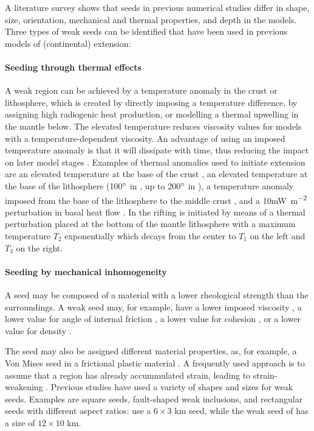 A literature survey shows that seeds in previous numerical studies differ in shape, size, 
orientation, mechanical and thermal properties, and depth in the models. 
Three types of weak seeds can be identified that have been 
used in previous models of (continental) extension:

\paragraph{Seeding through thermal effects}
A weak region can be achieved by a temperature anomaly in the crust or lithosphere,
which is created by directly imposing a temperature difference, by assigning high radiogenic 
heat production, or modelling a thermal upwelling in the mantle below.
The elevated temperature reduces viscosity values for models with a temperature-dependent 
viscosity.
An advantage of using an imposed temperature anomaly is that it will dissipate with time, 
thus reducing the impact on later model stages \cite{hani03}.
Examples of thermal anomalies used to initiate extension are
an elevated temperature at the base of the crust \cite{hani03},
an elevated temperature at the base of the lithosphere 
(100$\rm^\circ$ in \cite{bupo01}, 
up to 200$\rm^\circ$ in \cite{brau13}),
a temperature anomaly imposed from the base of the lithosphere to the middle
crust \cite{chld92},
and a 10\si{\milli\watt\per\square\metre} perturbation in basal heat flow \cite{frbr01}.
In \cite{bupo01} the rifting is initiated by means of 
a thermal perturbation placed at the bottom of the mantle lithosphere with a maximum temperature $T_{2}$ 
exponentially which decays from the center to $T_{1}$ on the left and $T_{3}$ on the right. 

\paragraph{Seeding by mechanical inhomogeneity} 
A seed may be composed of a material with a lower rheological strength than the 
surroundings.
A weak seed may, for example, have a lower imposed viscosity 
\cite{lemm08,kaus10,mishin11}, 
a lower value for angle of internal friction 
\cite{pybf02,kapo06,thie11,grpy13,chbe13}, 
a lower value for cohesion \cite{alht11}, or a lower value for density \cite{tibb08}. 

The seed may also be assigned different material properties, as, for example,
a Von Mises seed in a frictional plastic material \cite{hube07}.
A frequently used approach is to assume that a region has already accummulated
strain, leading to strain-weakening 
\cite{labp00,hubb05,peso08,alht11,alht12,knak13,alhf13}. 
Previous studies have used a variety of shapes and sizes for weak seeds. 
Examples are square seeds, fault-shaped weak inclusions, and rectangular seeds with different 
aspect ratios: \cite{hubb05} use a $6\times 3$ km seed, while the weak seed 
of \cite{hube07} has a size of $12\times 10$ km. 

